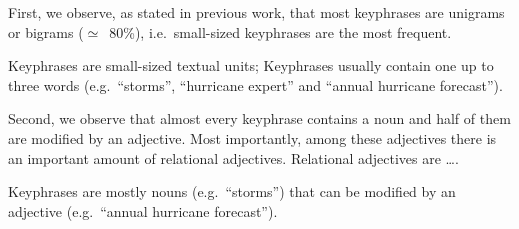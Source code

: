     First, we observe, as stated in previous work, that most keyphrases are
    unigrams or bigrams ($\simeq$~80\%), i.e.~small-sized keyphrases are the
    most frequent.
    
    \begin{property}\label{prop:informativity}
      Keyphrases are small-sized textual units; Keyphrases usually contain one
      up to three words (e.g.~``storms'', ``hurricane expert'' and ``annual
      hurricane forecast'').
    \end{property}

    Second, we observe that almost every keyphrase contains a noun and half of
    them are modified by an adjective. Most importantly, among these adjectives
    there is an important amount of relational adjectives. Relational adjectives
    are \dots. 

    \begin{property}\label{prop:noun_phrases}
      Keyphrases are mostly nouns (e.g.~``storms'') that can be modified by an
      adjective (e.g.~``annual hurricane forecast'').
    \end{property}

